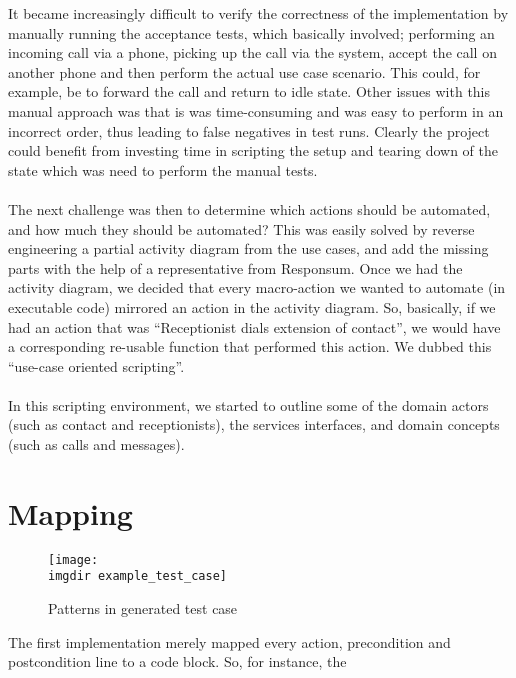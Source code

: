 It became increasingly difficult to verify the correctness of the implementation by manually running the acceptance tests, which basically involved; performing an incoming call via a phone, picking up the call via the system, accept the call on another phone and then perform the actual use case scenario. This could, for example, be to forward the call and return to idle state. Other issues with this manual approach was that is was time-consuming and was easy to perform in an incorrect order, thus leading to false negatives in test runs. Clearly the project could benefit from investing time in scripting the setup and tearing down of the state which was need to perform the manual tests.\\\\
The next challenge was then to determine which actions should be automated, and how much they should be automated? This was easily solved by reverse engineering a partial activity diagram from the use cases, and add the missing parts with the help of a representative from Responsum. Once we had the activity diagram, we decided that every macro-action we wanted to automate (in executable code) mirrored an action in the activity diagram. So, basically, if we had an action that was ``Receptionist dials extension of contact'', we would have a corresponding re-usable function that performed this action. We dubbed this ``use-case oriented scripting''.\\\\
In this scripting environment, we started to outline some of the domain actors (such as contact and receptionists), the services interfaces, and domain concepts (such as calls and messages).

\section{Mapping}

\begin{figure}[ht]
\centering
\texttt{[image: \\imgdir example\_test\_case]}
\caption{Patterns in generated test case}
\label{fig:domain_model}
\end{figure}
The first implementation merely mapped every action, precondition and postcondition line to a code block. So, for instance, the %

